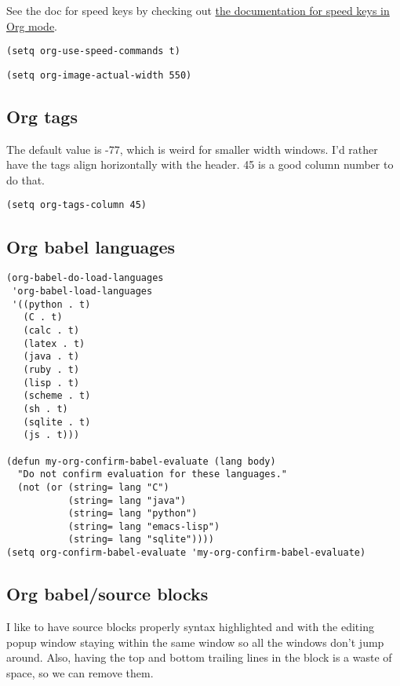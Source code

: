 \documentclass[11pt]{article}
\begin{document}
See the doc for speed keys by checking out \href{(info\%20"(org)\%20speed\%20keys")}{the documentation for
speed keys in Org mode}.

\begin{verbatim}
(setq org-use-speed-commands t)
\end{verbatim}

\begin{verbatim}
(setq org-image-actual-width 550)
\end{verbatim}

\subsection{Org tags}
\label{sec-10-3}

The default value is -77, which is weird for smaller width windows.
I'd rather have the tags align horizontally with the header. 45 is a
good column number to do that.

\begin{verbatim}
(setq org-tags-column 45)
\end{verbatim}

\subsection{Org babel languages}
\label{sec-10-4}

\begin{verbatim}
(org-babel-do-load-languages
 'org-babel-load-languages
 '((python . t)
   (C . t)
   (calc . t)
   (latex . t)
   (java . t)
   (ruby . t)
   (lisp . t)
   (scheme . t)
   (sh . t)
   (sqlite . t)
   (js . t)))

(defun my-org-confirm-babel-evaluate (lang body)
  "Do not confirm evaluation for these languages."
  (not (or (string= lang "C")
           (string= lang "java")
           (string= lang "python")
           (string= lang "emacs-lisp")
           (string= lang "sqlite"))))
(setq org-confirm-babel-evaluate 'my-org-confirm-babel-evaluate)
\end{verbatim}

\subsection{Org babel/source blocks}
\label{sec-10-5}

I like to have source blocks properly syntax highlighted and with the
editing popup window staying within the same window so all the windows
don't jump around. Also, having the top and bottom trailing lines in
the block is a waste of space, so we can remove them.
\end{document}
